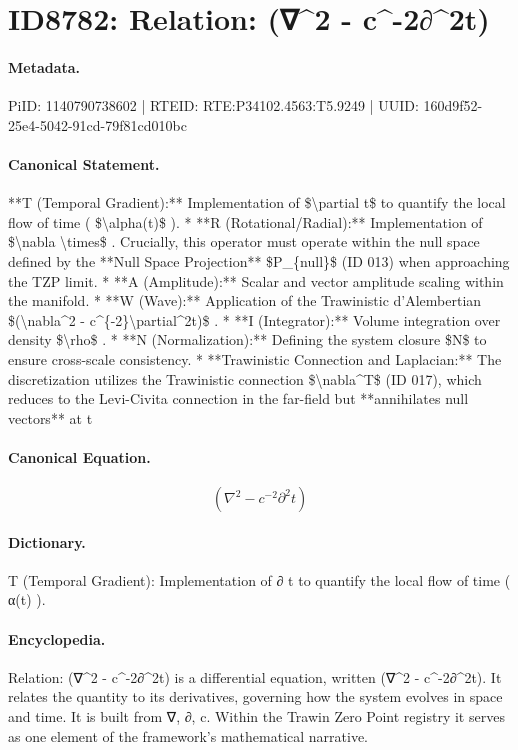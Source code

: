 \section*{ID8782: Relation: (∇\textasciicircum{}2 - c\textasciicircum{}-2∂\textasciicircum{}2t)}
\paragraph{Metadata.}
PiID: 1140790738602 | RTEID: RTE:P34102.4563:T5.9249 | UUID: 160d9f52-25e4-5042-91cd-79f81cd010bc

\paragraph{Canonical Statement.}
**T (Temporal Gradient):** Implementation of \$\textbackslash{}partial t\$ to quantify the local flow of time ( \$\textbackslash{}alpha(t)\$ ). * **R (Rotational/Radial):** Implementation of \$\textbackslash{}nabla \textbackslash{}times\$ . Crucially, this operator must operate within the null space defined by the **Null Space Projection** \$P\_\{null\}\$ (ID 013) when approaching the TZP limit. * **A (Amplitude):** Scalar and vector amplitude scaling within the manifold. * **W (Wave):** Application of the Trawinistic d’Alembertian \$(\textbackslash{}nabla\textasciicircum{}2 - c\textasciicircum{}\{-2\}\textbackslash{}partial\textasciicircum{}2t)\$ . * **I (Integrator):** Volume integration over density \$\textbackslash{}rho\$ . * **N (Normalization):** Defining the system closure \$N\$ to ensure cross-scale consistency. * **Trawinistic Connection and Laplacian:** The discretization utilizes the Trawinistic connection \$\textbackslash{}nabla\textasciicircum{}T\$ (ID 017), which reduces to the Levi-Civita connection in the far-field but **annihilates null vectors** at t

\paragraph{Canonical Equation.}
\[
(\nabla^2 - c^{-2}\partial^2t)
\]

\paragraph{Dictionary.}
T (Temporal Gradient): Implementation of ∂ t to quantify the local flow of time ( α(t) ).

\paragraph{Encyclopedia.}
Relation: (∇\textasciicircum{}2 - c\textasciicircum{}-2∂\textasciicircum{}2t) is a differential equation, written (∇\textasciicircum{}2 - c\textasciicircum{}-2∂\textasciicircum{}2t). It relates the quantity to its derivatives, governing how the system evolves in space and time. It is built from ∇, ∂, c. Within the Trawin Zero Point registry it serves as one element of the framework's mathematical narrative.
